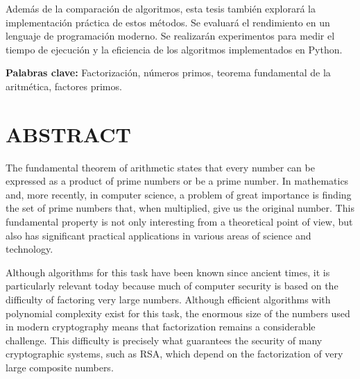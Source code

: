 Además de la comparación de algoritmos, esta tesis también explorará la implementación práctica de estos métodos. Se evaluará el rendimiento en un lenguaje de programación moderno. Se realizarán experimentos para medir el tiempo de ejecución y la eficiencia de los algoritmos implementados en Python.



\textbf{Palabras clave:} Factorización, números primos, teorema fundamental de la aritmética, factores primos.

\clearpage
\chapter*{\centering \normalsize ABSTRACT}
The fundamental theorem of arithmetic states that every number can be expressed as a product of prime numbers or be a prime number. In mathematics and, more recently, in computer science, a problem of great importance is finding the set of prime numbers that, when multiplied, give us the original number. This fundamental property is not only interesting from a theoretical point of view, but also has significant practical applications in various areas of science and technology.

Although algorithms for this task have been known since ancient times, it is particularly relevant today because much of computer security is based on the difficulty of factoring very large numbers. Although efficient algorithms with polynomial complexity exist for this task, the enormous size of the numbers used in modern cryptography means that factorization remains a considerable challenge. This difficulty is precisely what guarantees the security of many cryptographic systems, such as RSA, which depend on the factorization of very large composite numbers.

